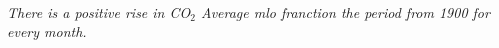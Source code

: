 \documentclass[11pt]{article}
\begin{document}
    \begin{center}
    \end{center}
    { \hspace*{\fill} \\}
    
    \emph{There is a positive rise in CO$_2$ Average mlo franction the period from 1900 for every month.}

\end{document}
